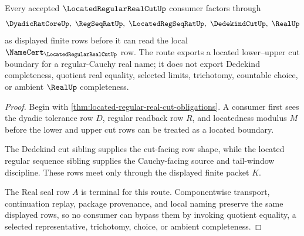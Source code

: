 \begin{theorem}
\label{thm:located-regular-real-cut-cauchy-boundary-route}
Every accepted $\LocatedRegularRealCutUp$ consumer factors through
$$
\DyadicRatCoreUp,\ \RegSeqRatUp,\ \LocatedRegSeqRatUp,\ \DedekindCutUp,\ \RealUp
$$
as displayed finite rows before it can read the local $\NameCert_{\LocatedRegularRealCutUp}$ row. The route exports a located lower--upper cut boundary for a regular-Cauchy real name; it does not export Dedekind completeness, quotient real equality, selected limits, trichotomy, countable choice, or ambient $\RealUp$ completeness.
\end{theorem}
\begin{proof}
Begin with \autoref{thm:located-regular-real-cut-obligations}. A consumer first sees the dyadic tolerance row $D$, regular readback row $R$, and locatedness modulus $M$ before the lower and upper cut rows can be treated as a located boundary.

The Dedekind cut sibling supplies the cut-facing row shape, while the located regular sequence sibling supplies the Cauchy-facing source and tail-window discipline. These rows meet only through the displayed finite packet $K$.

The Real seal row $A$ is terminal for this route. Componentwise transport, continuation replay, package provenance, and local naming preserve the same displayed rows, so no consumer can bypass them by invoking quotient equality, a selected representative, trichotomy, choice, or ambient completeness.
\end{proof}




